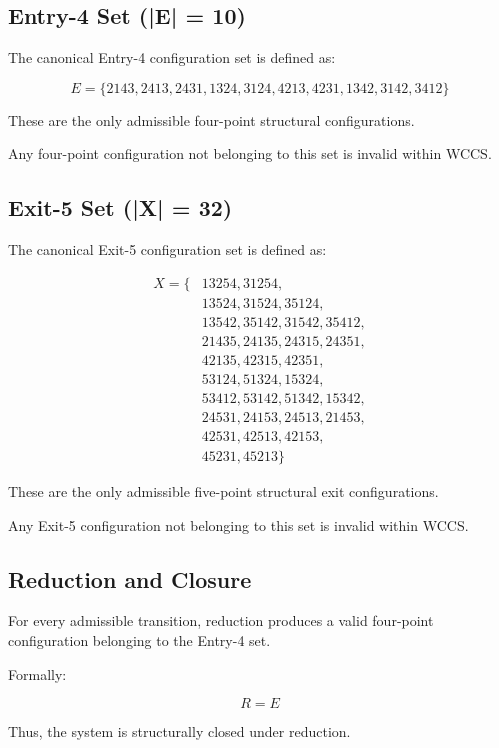\documentclass[11pt]{article}
\begin{document}
\subsection{Entry-4 Set (|E| = 10)}

The canonical Entry-4 configuration set is defined as:

\[
E =
\{
2143, 2413, 2431,
1324, 3124, 4213,
4231, 1342, 3142, 3412
\}
\]

These are the only admissible four-point structural configurations.

Any four-point configuration not belonging to this set is invalid within WCCS.

\subsection{Exit-5 Set (|X| = 32)}

The canonical Exit-5 configuration set is defined as:

\[
\begin{aligned}
X = \{&
13254, 31254, \\
&13524, 31524, 35124, \\
&13542, 35142, 31542, 35412, \\
&21435, 24135, 24315, 24351, \\
&42135, 42315, 42351, \\
&53124, 51324, 15324, \\
&53412, 53142, 51342, 15342, \\
&24531, 24153, 24513, 21453, \\
&42531, 42513, 42153, \\
&45231, 45213
\}
\end{aligned}
\]

These are the only admissible five-point structural exit configurations.

Any Exit-5 configuration not belonging to this set is invalid within WCCS.


\subsection{Reduction and Closure}

For every admissible transition, reduction produces a valid four-point configuration belonging to the Entry-4 set.

Formally:

\[
R = E
\]

Thus, the system is structurally closed under reduction.
\end{document}
